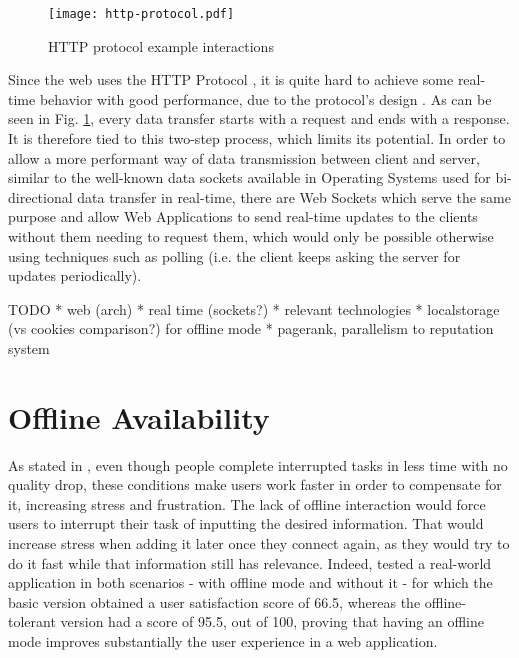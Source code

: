 \begin{figure}[t]
    \begin{center}
      \leavevmode
      \texttt{[image: http-protocol.pdf]}
      \caption{HTTP protocol example interactions}
      \label{fig:http-protocol}
    \end{center}
  \end{figure}

Since the web uses the HTTP Protocol \cite{http1-1protocol} \cite{http2protocol}, it is quite hard to achieve some real-time behavior with good performance, due to the protocol's design \cite{Spero1994}. As can be seen in Fig. \ref{fig:http-protocol}, every data transfer starts with a request and ends with a response. It is therefore tied to this two-step process, which limits its potential. In order to allow a more performant way of data transmission between client and server, similar to the well-known data sockets available in Operating Systems used for bi-directional data transfer in real-time, there are Web Sockets \cite{websocket-protocol} which serve the same purpose and allow Web Applications to send real-time updates to the clients without them needing to request them, which would only be possible otherwise using techniques such as polling (i.e. the client keeps asking the server for updates periodically). 


TODO
* web (arch)
* real time (sockets?)
* relevant technologies
* localstorage (vs cookies comparison?) for offline mode
* pagerank, parallelism to reputation system

\section{Offline Availability}\label{sec:offline-avail-sota}

As stated in \cite{Mark2008}, even though people complete interrupted tasks in less time with no quality drop, these conditions make users work faster in order to compensate for it, increasing stress and frustration. The lack of offline interaction would force users to interrupt their task of inputting the desired information. That would increase stress when adding it later once they connect again, as they would try to do it fast while that information still has relevance. Indeed, \cite{Marco2015} tested a real-world application in both scenarios - with offline mode and without it - for which the basic version obtained a user satisfaction score of 66.5, whereas the offline-tolerant version had a score of 95.5, out of 100, proving that having an offline mode improves substantially the user experience in a web application. 


